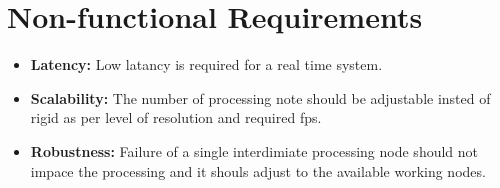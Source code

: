 \section{Non-functional Requirements}
\begin{itemize}
    \item \textbf{Latency:} Low latancy is required for a real time system.
    
    \item \textbf{Scalability:} The number of processing note should be adjustable insted of rigid as per level of resolution and required \gls{fps}.
    
    \item \textbf{Robustness:} Failure of a single interdimiate processing node should not impace the processing and it shouls adjust to the available working nodes.
\end{itemize}